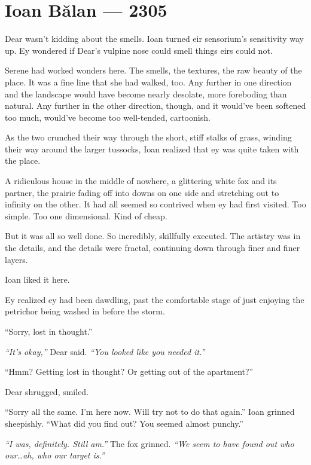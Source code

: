 \hypertarget{ioan-bux103lan-2305}{%
\chapter*{Ioan Bălan — 2305}\label{ioan-bux103lan-2305}}

Dear wasn't kidding about the smells. Ioan turned eir sensorium's sensitivity way up. Ey wondered if Dear's vulpine nose could smell things eirs could not.

Serene had worked wonders here. The smells, the textures, the raw beauty of the place. It was a fine line that she had walked, too. Any further in one direction and the landscape would have become nearly desolate, more foreboding than natural. Any further in the other direction, though, and it would've been softened too much, would've become too well-tended, cartoonish.

As the two crunched their way through the short, stiff stalks of grass, winding their way around the larger tussocks, Ioan realized that ey was quite taken with the place.

A ridiculous house in the middle of nowhere, a glittering white fox and its partner, the prairie fading off into downs on one side and stretching out to infinity on the other. It had all seemed so contrived when ey had first visited. Too simple. Too one dimensional. Kind of cheap.

But it was all so well done. So incredibly, skillfully executed. The artistry was in the details, and the details were fractal, continuing down through finer and finer layers.

Ioan liked it here.

Ey realized ey had been dawdling, past the comfortable stage of just enjoying the petrichor being washed in before the storm.

``Sorry, lost in thought.''

\emph{``It's okay,''} Dear said. \emph{``You looked like you needed it.''}

``Hmm? Getting lost in thought? Or getting out of the apartment?''

Dear shrugged, smiled.

``Sorry all the same. I'm here now. Will try not to do that again.'' Ioan grinned sheepishly. ``What did you find out? You seemed almost punchy.''

\emph{``I was, definitely. Still am.''} The fox grinned. \emph{``We seem to have found out who our\ldots{}ah, who our target is.''}

